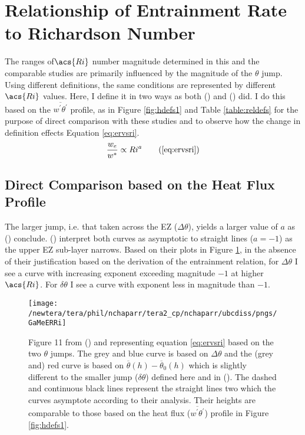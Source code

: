 \section{Relationship of Entrainment Rate to Richardson Number}

The ranges of$\acs{Ri}$ number magnitude determined in this and the comparable studies are primarily influenced by the magnitude of the $\theta$ jump. Using different definitions, the same conditions are represented by different$\acs{Ri}$ values. Here, I define it in two ways as both \citeauthor{FedConzMir04} (\citeyear{FedConzMir04}) and \citeauthor{GarciaMellado} (\citeyear{GarciaMellado}) did.  I do this based on the $\overline{w^{'}\theta^{'}}$ profile, as in Figure \ref{fig:hdefs1} and Table \ref{table:reldefs} for the purpose of direct comparison with these studies and to observe how the change in definition effects Equation \ref{eq:ervsri}.\\

\begin{equation}
\frac{w_{e}}{w^{*}} \propto Ri^{a} \tag{\ref{eq:ervsri}}
\end{equation}

\subsection{Direct Comparison based on the Heat Flux Profile}
The larger jump, i.e. that taken across the \acs{EZ} ($\Delta \theta$), yields a larger value of $a$ as \citeauthor{FedConzMir04} (\citeyear{FedConzMir04}) conclude.  \citeauthor{GarciaMellado} (\citeyear{GarciaMellado}) interpret both curves as asymptotic to straight lines ($a=-1$) as the upper \acs{EZ} sub-layer narrows. Based on their plots in Figure \ref{fig:GarcMelERRi}, in the absence of their justification based on the derivation of the entrainment relation, for $\Delta \theta$ I see a curve with increasing exponent exceeding magnitude $-1$ at higher $\acs{Ri}$.  For $\delta \theta$ I see a curve with exponent less in magnitude than $-1$.\\

\begin{figure}[htbp]
    \centering
    \texttt{[image: /newtera/tera/phil/nchaparr/tera2\_cp/nchaparr/ubcdiss/pngs/GaMeERRi]}
    \caption[Plots of scaled entrainment rate vs Richardson number from \citeauthor{GarciaMellado} (\citeyear{GarciaMellado})]{Figure 11 from \citeauthor{GarciaMellado} (\citeyear{GarciaMellado}) and representing equation \ref{eq:ervsri} based on the two $\theta$ jumps.  The grey and blue curve is based on $\Delta \theta$ and the (grey and) red curve is based on $\overline{\theta}(h) - \overline{\theta}_{0}(h)$ which is slightly different to the smaller jump ($\delta \theta$) defined here and in \citeauthor{FedConzMir04} (\citeyear{FedConzMir04}). The dashed and continuous black lines represent the straight lines two which the curves asymptote according to their analysis. Their heights are comparable to those based on the heat flux ($\overline{w^{'}\theta^{'}}$) profile in Figure \ref{fig:hdefs1}.}
    \label{fig:GarcMelERRi}   %
\end{figure}

